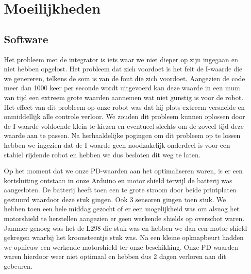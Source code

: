 \chapter{Moeilijkheden}\label{Moeilijkheden}
\section{Software}
Het probleem met de integrator is iets waar we niet dieper op zijn ingegaan en niet hebben opgelost. Het probleem dat zich voordoet is het feit de I-waarde die we genereren, telkens de som is van de fout die zich voordoet. Aangezien de code meer dan 1000 keer per seconde wordt uitgevoerd kan deze waarde in een mum van tijd een extreem grote waarden aannemen wat niet gunstig is voor de robot. Het effect van dit probleem op onze robot was dat hij plots extreem versnelde en onmiddellijk alle controle verloor. We zouden dit probleem kunnen oplossen door de I-waarde voldoende klein te kiezen en eventueel slechts om de zoveel tijd deze waarde aan te passen. Na herhaaldelijke pogingen om dit probleem op te lossen hebben we ingezien dat de I-waarde geen noodzakelijk onderdeel is voor een stabiel rijdende robot en hebben we dus besloten dit weg te laten.

Op het moment dat we onze PD-waarden aan het optimaliseren waren, is er een kortsluiting ontstaan in onze Arduino en motor shield terwijl de batterij was aangesloten. De batterij heeft toen een te grote stroom door beide printplaten gestuurd waardoor deze stuk gingen. Ook 3 sensoren gingen toen stuk. We hebben toen een hele middag gezocht of er een mogelijkheid was om alsnog het motorshield te herstellen aangezien er geen werkende shields op overschot waren. Jammer genoeg was het de L298 die stuk was en hebben we dan een motor shield gekregen waarbij het kroonsteentje stuk was. Na een kleine opknapbeurt hadden we opnieuw een werkende motorshield ter onze beschikking. Onze PD-waarden waren hierdoor weer niet optimaal en hebben dus 2 dagen verloren aan dit gebeuren.

